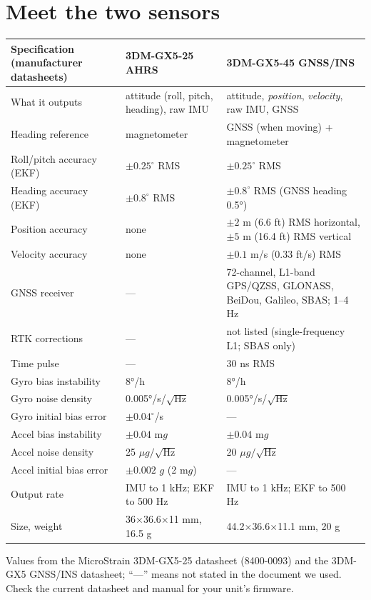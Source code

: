 \section{Meet the two sensors}
\begin{center}\small
\renewcommand{\arraystretch}{1.18}
\begin{tabularx}{\linewidth}{>{\raggedright\arraybackslash}p{4.3cm}XX}\toprule
\textbf{Specification (manufacturer datasheets)} & \textbf{3DM-GX5-25 AHRS} & \textbf{3DM-GX5-45 GNSS/INS}\\\midrule
What it outputs & attitude (roll, pitch, heading), raw IMU & attitude, \emph{position}, \emph{velocity}, raw IMU, GNSS\\
Heading reference & magnetometer & GNSS (when moving) + magnetometer\\
Roll/pitch accuracy (EKF) & $\pm0.25^\circ$ RMS & $\pm0.25^\circ$ RMS\\
Heading accuracy (EKF) & $\pm0.8^\circ$ RMS & $\pm0.8^\circ$ RMS (GNSS heading 0.5°)\\
Position accuracy & none & $\pm2$ m (6.6 ft) RMS horizontal, $\pm5$ m (16.4 ft) RMS vertical\\
Velocity accuracy & none & $\pm0.1$ m/s (0.33 ft/s) RMS\\
GNSS receiver & --- & 72-channel, L1-band GPS/QZSS, GLONASS, BeiDou, Galileo, SBAS; 1--4 Hz\\
RTK corrections & --- & not listed (single-frequency L1; SBAS only)\\
Time pulse & --- & 30 ns RMS\\
Gyro bias instability & 8°/h & 8°/h\\
Gyro noise density & 0.005°/s/$\sqrt{\text{Hz}}$ & 0.005°/s/$\sqrt{\text{Hz}}$\\
Gyro initial bias error & $\pm0.04^\circ$/s & ---\\
Accel bias instability & $\pm0.04$ m$g$ & $\pm0.04$ m$g$\\
Accel noise density & 25 $\mu g/\sqrt{\text{Hz}}$ & 20 $\mu g/\sqrt{\text{Hz}}$\\
Accel initial bias error & $\pm0.002$ $g$ (2 m$g$) & ---\\
Output rate & IMU to 1 kHz; EKF to 500 Hz & IMU to 1 kHz; EKF to 500 Hz\\
Size, weight & 36$\times$36.6$\times$11 mm, 16.5 g & 44.2$\times$36.6$\times$11.1 mm, 20 g\\\bottomrule
\end{tabularx}\end{center}
{\footnotesize Values from the MicroStrain 3DM-GX5-25 datasheet (8400-0093) and the 3DM-GX5 GNSS/INS datasheet; ``---'' means not stated in the document we used. Check the current datasheet and manual for your unit's firmware.}

